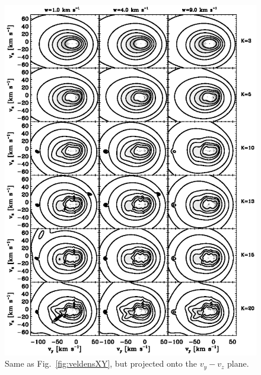\clearpage
\begin{figure}
\includegraphics{figs_veldist/veldensYZ.ps}
\caption[Same as Fig.~\ref{fig:veldensXY}, but projected onto the $v_y-v_z$ plane]{Same as Fig.~\ref{fig:veldensXY}, but projected onto the $v_y-v_z$ plane.}%
\label{fig:veldensYZ}
\end{figure}


